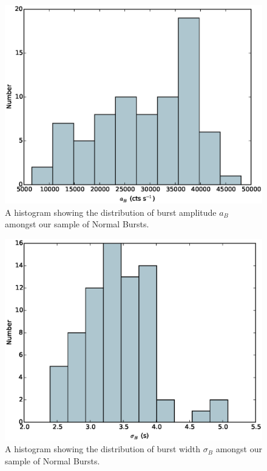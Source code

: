 \begin{figure}
  \centering
  \includegraphics[width=.9\linewidth, trim={0cm 0 0cm 0},clip]{images/appendix_burst_pa_hist.eps}
  \caption{\small A histogram showing the distribution of burst amplitude $a_B$ amongst our sample of Normal Bursts.}
  \label{fig:app_hist_ab}
\end{figure}

\begin{figure}
  \centering
  \includegraphics[width=.9\linewidth, trim={0cm 0 0cm 0},clip]{images/appendix_burst_sigma_hist.eps}
  \caption{\small A histogram showing the distribution of burst width $\sigma_B$ amongst our sample of Normal Bursts.}
  \label{fig:app_hist_sigb}
\end{figure}

